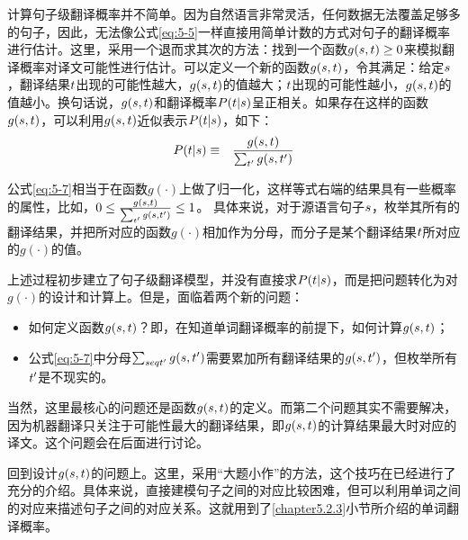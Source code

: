 \parinterval 计算句子级翻译概率并不简单。因为自然语言非常灵活，任何数据无法覆盖足够多的句子，因此，无法像公式\eqref{eq:5-5}一样直接用简单计数的方式对句子的翻译概率进行估计。这里，采用一个退而求其次的方法：找到一个函数$g({s},{t})\ge 0$来模拟翻译概率对译文可能性进行估计。可以定义一个新的函数$g({s},{t})$，令其满足：给定${s}$，翻译结果${t}$出现的可能性越大，$g({s},{t})$的值越大；${t}$出现的可能性越小，$g({s},{t})$的值越小。换句话说，$g({s},{t})$和翻译概率${P}({t}|{s})$呈正相关。如果存在这样的函数$g({s},{t}
)$，可以利用$g({s},{t})$近似表示${P}({t}|{s})$，如下：
\begin{eqnarray}
{P}({t}|{s}) & \equiv & \frac{g({s},{t})}{\sum_{{t}'}g({s},{t}')}
\label{eq:5-7}
\end{eqnarray}

\parinterval 公式\eqref{eq:5-7}相当于在函数$g(\cdot)$上做了归一化，这样等式右端的结果具有一些概率的属性，比如，$0 \le \frac{g({s},{t})}{\sum_{{t'}}g({s},{t'})} \le 1$。 具体来说，对于源语言句子${s}$，枚举其所有的翻译结果，并把所对应的函数$g(\cdot)$相加作为分母，而分子是某个翻译结果${t}$所对应的$g(\cdot)$的值。

\parinterval 上述过程初步建立了句子级翻译模型，并没有直接求${P}({t}|{s})$，而是把问题转化为对$g(\cdot)$的设计和计算上。但是，面临着两个新的问题：

\begin{itemize}
\vspace{0.5em}
\item 如何定义函数$g({s},{t})$？即，在知道单词翻译概率的前提下，如何计算$g({s},{t})$；
\vspace{0.5em}
\item 公式\eqref{eq:5-7}中分母$\sum_{seq{t'}}g({s},{{t}'})$需要累加所有翻译结果的$g({s},{{t}'})$，但枚举所有${{t}'}$是不现实的。
\vspace{0.5em}
\end{itemize}

\parinterval  当然，这里最核心的问题还是函数$g({s},{t})$的定义。而第二个问题其实不需要解决，因为机器翻译只关注于可能性最大的翻译结果，即$g({s},{t})$的计算结果最大时对应的译文。这个问题会在后面进行讨论。

\parinterval 回到设计$g({s},{t})$的问题上。这里，采用“大题小作”的方法，这个技巧在{\chaptertwo}已经进行了充分的介绍。具体来说，直接建模句子之间的对应比较困难，但可以利用单词之间的对应来描述句子之间的对应关系。这就用到了\ref{chapter5.2.3}小节所介绍的单词翻译概率。

